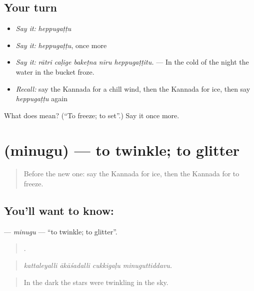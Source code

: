 \subsection*{Your turn}
\begin{itemize}
\raggedright
  \item \emph{Say it:} \emph{heppugaṭṭu}
  \item \emph{Say it:} \emph{heppugaṭṭu}, once more
  \item \emph{Say it:} \emph{rātri caḷige bakeṭna nīru heppugaṭṭitu.} — In the cold of the night the water in the bucket froze.
  \item \emph{Recall:} say the Kannada for a chill wind, then the Kannada for ice, then say \emph{heppugaṭṭu} again
\end{itemize}

\begin{tcolorbox}[breakable,colback=teal!4,colframe=teal!35!black,title={Before you move on}]
What does  mean? (\textquotedblleft{}To freeze; to set\textquotedblright{}.) Say it once more.
\end{tcolorbox}
\section[\texorpdfstring{\kn{ಮಿನುಗು} (minugu)}{ಮಿನುಗು (minugu)}]{ (minugu) — to twinkle; to glitter}

\label{lesson:KA-C489-minugu}



\begin{quote}
Before the new one: say the Kannada for ice, then the Kannada for to freeze.
\end{quote}

\subsection*{You'll want to know: }
\textbf{} — \emph{minugu} — \textquotedblleft{}to twinkle; to glitter\textquotedblright{}.

\begin{quote}
   .
\end{quote}

\begin{quote}
\emph{kattaleyalli ākāśadalli cukkigaḷu minuguttiddavu.}
\end{quote}

\begin{quote}
In the dark the stars were twinkling in the sky.
\end{quote}


